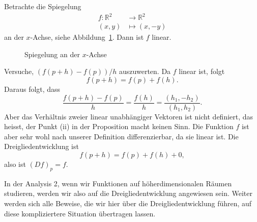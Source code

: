 \documentclass[../main.tex]{subfiles}
\begin{document}
\begin{example}
  Betrachte die Spiegelung
  \begin{align*}
    f \colon \mathbb{R}^2 & \to \mathbb{R}^2 \\
    (x, y) & \mapsto (x, -y)
  \end{align*}
  an der $x$-Achse, siehe
  Abbildung~\ref{fig:reflection}. Dann ist $f$ linear.

\begin{figure}[htb]
  \centering
  
  \caption{Spiegelung an der $x$-Achse}%
  \label{fig:reflection}
\end{figure}

  Versuche,
$(f(p + h) - f(p))/h$
auszuwerten. Da $f$ linear ist, folgt
\[
  f(p + h) = f(p) + f(h).
\]
Daraus folgt, 
dass
\[
  \frac{f(p+h) - f(p)}{h} = \frac{f(h)}{h}
  = \frac{(h_1, -h_2)}{(h_1, h_2)}.
\]
Aber das Verhältnis zweier linear unabhängiger
Vektoren ist nicht definiert,
das heisst, der Punkt (ii) in der Proposition
macht keinen Sinn.
Die Funktion $f$ ist aber sehr wohl
nach unserer Definition differenzierbar,
da sie linear ist. Die Dreigliedentwicklung
ist
\[
  f(p + h) = f(p) + f(h) + 0,
\]
also ist ${(Df)}_p = f$.

In der Analysis 2, wenn wir Funktionen
auf höherdimensionalen Räumen
studieren, werden wir also auf
die Dreigliedentwicklung angewiesen sein.
Weiter werden sich alle Beweise, die wir
hier über die Dreigliedentwicklung führen,
auf diese kompliziertere Situation
übertragen lassen.
\end{example}
\end{document}
